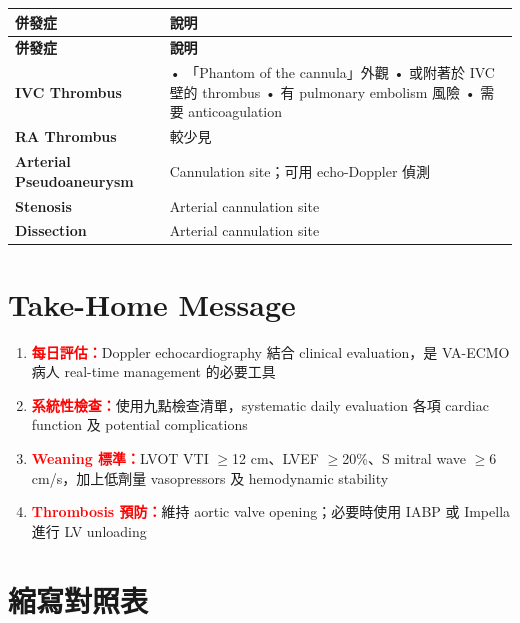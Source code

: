 \documentclass[12pt,a4paper]{article}
\begin{document}
\begin{longtable}{p{4cm}p{10cm}}
\toprule
\textbf{併發症} & \textbf{說明} \\
\midrule
\endfirsthead

\toprule
\textbf{併發症} & \textbf{說明} \\
\midrule
\endhead

\bottomrule
\endfoot

\textbf{IVC Thrombus} &
• 「Phantom of the cannula」外觀\newline
• 或附著於 IVC 壁的 thrombus\newline
• 有 pulmonary embolism 風險\newline
• 需要 anticoagulation \\
\midrule
\textbf{RA Thrombus} & 較少見 \\
\midrule
\textbf{Arterial Pseudoaneurysm} & Cannulation site；可用 echo-Doppler 偵測 \\
\midrule
\textbf{Stenosis} & Arterial cannulation site \\
\midrule
\textbf{Dissection} & Arterial cannulation site \\
\bottomrule
\end{longtable}

\section{Take-Home Message}

\begin{enumerate}
    \item \textcolor{red}{\textbf{每日評估：}}Doppler echocardiography 結合 clinical evaluation，是 VA-ECMO 病人 real-time management 的必要工具
    \item \textcolor{red}{\textbf{系統性檢查：}}使用九點檢查清單，systematic daily evaluation 各項 cardiac function 及 potential complications
    \item \textcolor{red}{\textbf{Weaning 標準：}}LVOT VTI $\geq$12 cm、LVEF $\geq$20\%、S mitral wave $\geq$6 cm/s，加上低劑量 vasopressors 及 hemodynamic stability
    \item \textcolor{red}{\textbf{Thrombosis 預防：}}維持 aortic valve opening；必要時使用 IABP 或 Impella 進行 LV unloading
\end{enumerate}

\section{縮寫對照表}
\end{document}
